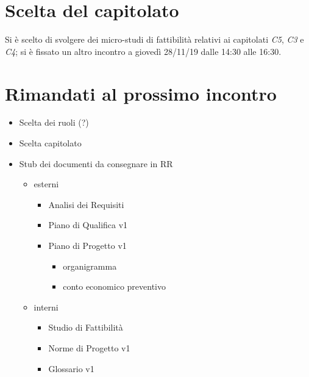 \documentclass{article}
\begin{document}
\section{Scelta del capitolato}%
\label{sec:scelta_del_capitolato}
Si è scelto di svolgere dei micro-studi di fattibilità relativi ai capitolati \textit{C5}, \textit{C3} e \textit{C4}; si è fissato un altro incontro a giovedì 28/11/19 dalle 14:30 alle 16:30.

\section{Rimandati al prossimo incontro}%
\label{sec:rimandati_al_prossimo_incontro}

\begin{itemize}
  \item Scelta dei ruoli (?)
  \item Scelta capitolato
  \item Stub dei documenti da consegnare in RR
        \begin{itemize}
          \item esterni
                \begin{itemize}
                  \item Analisi dei Requisiti
                  \item Piano di Qualifica v1
                  \item Piano di Progetto v1
                        \begin{itemize}
                          \item organigramma
                          \item conto economico preventivo
                        \end{itemize}
                \end{itemize}
          \item interni
                \begin{itemize}
                  \item Studio di Fattibilità
                  \item Norme di Progetto v1
                  \item Glossario v1
                \end{itemize}
        \end{itemize}
\end{itemize}
\end{document}
